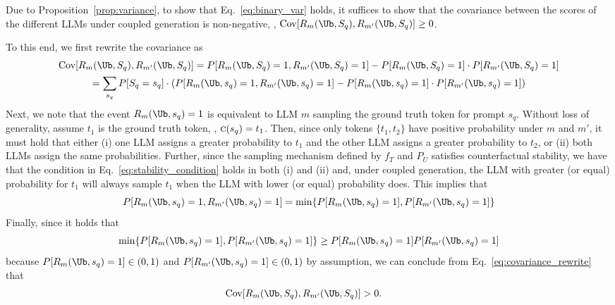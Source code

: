 Due to Proposition~\ref{prop:variance}, to show that Eq.~\ref{eq:binary_var} holds, it suffices to show that the covariance between the scores of the different LLMs under coupled generation is non-negative, \ie, $\Cov[R_m(\Ub,S_q),R_{m'}(\Ub,S_q)]\geq 0$.

To this end, we first rewrite the covariance as
    \begin{multline}
            \Cov[R_m(\Ub,S_q),R_{m'}(\Ub,S_q)] = \PP[R_m(\Ub,S_q)=1, R_{m'}(\Ub,S_q)=1] -\PP[R_m(\Ub,S_q)=1]\cdot \PP[R_{m'}(\Ub,S_q)=1] \\ \label{eq:covariance_rewrite}
            =\sum_{s_q} \PP[S_q=s_q] \cdot \left( \PP[R_m(\Ub,s_q)=1, R_{m'}(\Ub,s_q)=1]-\PP[R_m(\Ub,s_q)=1]\cdot \PP[R_{m'}(\Ub,s_q)=1] \right) 
    \end{multline}
%
Next, we note that the event $R_m(\Ub,s_q)=1$ is equivalent to LLM $m$ sampling the ground truth token for prompt $s_q$. 
%
Without loss of generality, assume $t_1$ is the ground truth token, \ie, $\textsc{c}(s_q)=t_1$. 
%
Then, since only tokens $\{t_1, t_2\}$ have positive probability under $m$ and $m'$, it must hold that either (i) one LLM assigns a greater probability to $t_1$ and the other LLM assigns a greater probability to $t_2$, 
%
or (ii) both LLMs assign the same probabilities. 
%
Further, since the sampling mechanism defined by $f_T$ and $P_U$ satisfies counterfactual stability, we have that the condition in Eq.~\ref{eq:stability_condition} holds in both (i) and (ii) and, under coupled generation, the LLM with greater (or equal) probability for $t_1$ will always sample $t_1$ when the LLM with lower (or equal) probability does. 
%
This implies that
%
\begin{equation}
    \PP[R_m(\Ub,s_q)=1, R_{m'}(\Ub,s_q)=1] = \min\{ \PP[R_m(\Ub,s_q)=1], \PP[R_{m'}(\Ub,s_q)=1]\}
\end{equation}
%
Finally, since it holds that
%
\begin{equation}
    \min\{ \PP[R_m(\Ub,s_q)=1], \PP[R_{m'}(\Ub,s_q)=1]\} \geq \PP[R_m(\Ub,s_q)=1] \PP[R_{m'}(\Ub,s_q)=1]
\end{equation}
because $\PP[R_m(\Ub,s_q)=1] \in (0,1)$ and $\PP[R_{m'}(\Ub,s_q)=1]\in(0,1)$ by assumption,
we can conclude from Eq.~\ref{eq:covariance_rewrite} that
    \begin{equation}
        \begin{split}
            &\Cov[R_m(\Ub,S_q),R_{m'}(\Ub,S_q)] > 0.
        \end{split}
    \end{equation}
%
    
